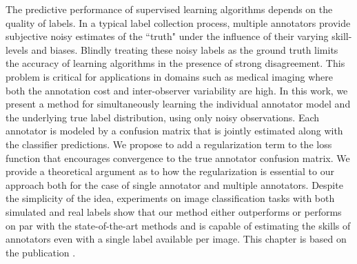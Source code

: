 
The predictive performance of supervised learning algorithms depends on the quality of labels. In a typical label collection process, multiple annotators provide subjective noisy estimates of the ``truth" under the influence of their varying skill-levels and biases. Blindly treating these noisy labels as the ground truth limits the accuracy of learning algorithms in the presence of strong disagreement. This problem is critical for applications in domains such as medical imaging where both the annotation cost and inter-observer variability are high. In this work, we present a method for simultaneously learning the individual annotator model and the underlying true label distribution, using only noisy observations. Each annotator is modeled by a confusion matrix that is jointly estimated along with the classifier predictions. We propose to add a regularization term to the loss function that encourages convergence to the true annotator confusion matrix. We provide a theoretical argument as to how the regularization is essential to our approach both for the case of single annotator and multiple annotators. Despite the simplicity of the idea, experiments on image classification tasks with both simulated and real labels show that our method either outperforms or performs on par with the state-of-the-art methods and is capable of estimating the skills of annotators even with a single label available per image. This chapter is based on the publication \cite{tanno2019learning}. 
 

